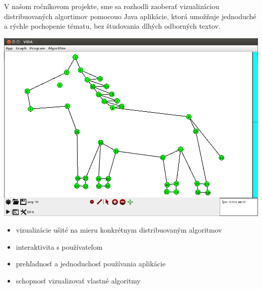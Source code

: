 
V našom ročníkovom projekte, sme sa rozhodli zaoberať vizualizáciou distribuovaných algortimov
pomocouo Java aplikácie, ktorá umožňuje jednoduché a rýchle pochopenie tématu, bez
študovania dlhých odborných textov.

\includegraphics[width=\columnwidth]{konik}

\begin{itemize}

    \item vizualizácie ušité na mieru konkrétnym distribuovaným algoritmov
    \item interaktivita s používateľom
    \item prehľadnosť a jednoduchosť používania aplikácie
    \item schopnosť vizualizovať vlastné algoritmy

\end{itemize}

